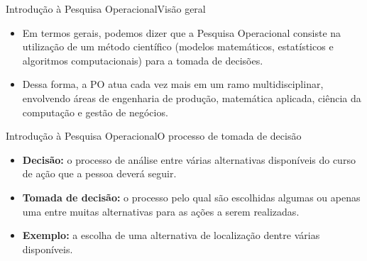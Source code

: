 \documentclass[t]{beamer}
\begin{document}

\begin{ftst}{Introdução à Pesquisa Operacional}{Visão geral}
\begin{itemize}
    \item Em termos gerais, podemos dizer que a Pesquisa Operacional consiste na utilização de um método científico (modelos matemáticos, estatísticos e algoritmos computacionais) para a tomada de decisões.
    \vone
    \item Dessa forma, a PO atua cada vez mais em um ramo multidisciplinar, envolvendo áreas de engenharia de produção, matemática aplicada, ciência da computação e gestão de negócios.
\end{itemize}
\end{ftst}


\begin{ftst}{Introdução à Pesquisa Operacional}{O processo de tomada de decisão}
\begin{itemize}
    \item \textbf{Decisão:} o processo de análise entre várias alternativas disponíveis do curso de ação que a pessoa deverá seguir.
    \item \textbf{Tomada de decisão:} o processo pelo qual são escolhidas algumas ou apenas uma entre muitas alternativas para as ações a serem realizadas.
    \item \textbf{Exemplo:} a escolha de uma alternativa de localização dentre várias disponíveis.
\end{itemize}

\end{ftst}

\end{document}
